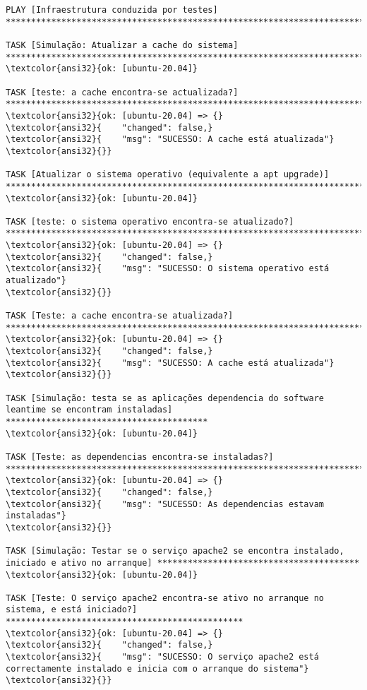 \documentclass{scrartcl}
\begin{document}
\begin{Verbatim}
PLAY [Infraestrutura conduzida por testes] ***********************************************************************************************

TASK [Simulação: Atualizar a cache do sistema] *******************************************************************************************
\textcolor{ansi32}{ok: [ubuntu-20.04]}

TASK [teste: a cache encontra-se actualizada?] *******************************************************************************************
\textcolor{ansi32}{ok: [ubuntu-20.04] => {}
\textcolor{ansi32}{    "changed": false,}
\textcolor{ansi32}{    "msg": "SUCESSO: A cache está atualizada"}
\textcolor{ansi32}{}}

TASK [Atualizar o sistema operativo (equivalente a apt upgrade)] *************************************************************************
\textcolor{ansi32}{ok: [ubuntu-20.04]}

TASK [teste: o sistema operativo encontra-se atualizado?] ********************************************************************************
\textcolor{ansi32}{ok: [ubuntu-20.04] => {}
\textcolor{ansi32}{    "changed": false,}
\textcolor{ansi32}{    "msg": "SUCESSO: O sistema operativo está atualizado"}
\textcolor{ansi32}{}}

TASK [Teste: a cache encontra-se atualizada?] ********************************************************************************************
\textcolor{ansi32}{ok: [ubuntu-20.04] => {}
\textcolor{ansi32}{    "changed": false,}
\textcolor{ansi32}{    "msg": "SUCESSO: A cache está atualizada"}
\textcolor{ansi32}{}}

TASK [Simulação: testa se as aplicações dependencia do software leantime se encontram instaladas] ****************************************
\textcolor{ansi32}{ok: [ubuntu-20.04]}

TASK [Teste: as dependencias encontra-se instaladas?] ************************************************************************************
\textcolor{ansi32}{ok: [ubuntu-20.04] => {}
\textcolor{ansi32}{    "changed": false,}
\textcolor{ansi32}{    "msg": "SUCESSO: As dependencias estavam instaladas"}
\textcolor{ansi32}{}}

TASK [Simulação: Testar se o serviço apache2 se encontra instalado, iniciado e ativo no arranque] ****************************************
\textcolor{ansi32}{ok: [ubuntu-20.04]}

TASK [Teste: O serviço apache2 encontra-se ativo no arranque no sistema, e está iniciado?] ***********************************************
\textcolor{ansi32}{ok: [ubuntu-20.04] => {}
\textcolor{ansi32}{    "changed": false,}
\textcolor{ansi32}{    "msg": "SUCESSO: O serviço apache2 está correctamente instalado e inicia com o arranque do sistema"}
\textcolor{ansi32}{}}


\end{Verbatim}
\end{document}
